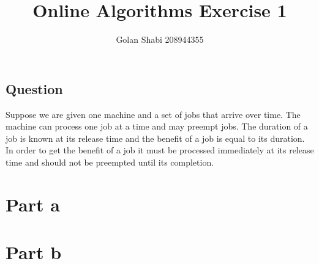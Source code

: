 \documentclass{article}
\title{Online Algorithms Exercise 1}
\author{Golan Shabi 208944355}
\begin{document}
\maketitle
\subsection*{Question}
Suppose we are given one machine and a set of jobs that arrive over time. The machine can process one job at a time and may preempt jobs. The duration of a job is known at its release time and the benefit of a job is equal to its duration. In order to get the benefit of a job it must be processed immediately at its release time and should not be preempted until its completion.
\section*{Part a}

\pagebreak

\section*{Part b}

\pagebreak
\end{document}
